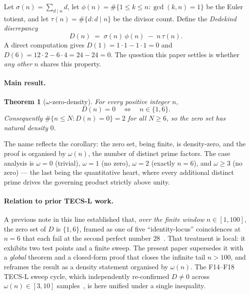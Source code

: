 \documentclass[11pt,a4paper]{article}
\newcommand{\sig}{\sigma}
\theoremstyle{plain}
\newtheorem{theorem}{Theorem}
\theoremstyle{definition}
\begin{document}
Let $\sig(n)=\sum_{d\mid n}d$, let $\phi(n)=\#\{1\le k\le n:\gcd(k,n)=1\}$ be
the Euler totient, and let $\tau(n)=\#\{d:d\mid n\}$ be the divisor count.
Define the \emph{Dedekind discrepancy}
\begin{equation}
  D(n) \;=\; \sig(n)\,\phi(n) \;-\; n\,\tau(n).
  \label{eq:D}
\end{equation}
A direct computation gives $D(1)=1\cdot1-1\cdot1=0$ and
$D(6)=12\cdot2-6\cdot4=24-24=0$. The question this paper settles is whether
\emph{any other} $n$ shares this property.

\paragraph{Main result.}
\begin{theorem}[$\omega$-zero-density]
\label{thm:main}
For every positive integer $n$,
\[
  D(n) = 0 \quad\Longleftrightarrow\quad n \in \{1,6\}.
\]
Consequently $\#\{n\le N : D(n)=0\}=2$ for all $N\ge6$, so the zero set has
natural density $0$.
\end{theorem}

\noindent The name reflects the corollary: the zero set, being finite, is
density-zero, and the proof is organised by $\omega(n)$, the number of distinct
prime factors. The case analysis is $\omega=0$ (trivial), $\omega=1$ (no zero),
$\omega=2$ (exactly $n=6$), and $\omega\ge3$ (no zero) --- the last being the
quantitative heart, where every additional distinct prime drives the governing
product strictly above unity.

\paragraph{Relation to prior TECS-L work.}
A previous note in this line established that, \emph{over the finite window}
$n\in[1,100]$, the zero set of $D$ is $\{1,6\}$, framed as one of five
``identity-locus'' coincidences at $n=6$ that each fail at the second perfect
number $28$~\citep{tecsLn6}. That treatment is local: it exhibits two test
points and a finite sweep. The present paper supersedes it with a
\emph{global} theorem and a closed-form proof that closes the infinite tail
$n>100$, and reframes the result as a density statement organised by
$\omega(n)$. The F14--F18 TECS-L sweep cycle, which independently re-confirmed
$D\neq0$ across $\omega(n)\in[3,10]$ samples~\citep{tecsLf14}, is here unified
under a single inequality.
\end{document}
